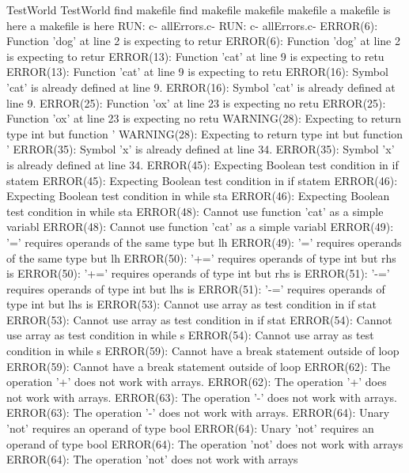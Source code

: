 \documentclass[12pt]{book}
\begin{document}
TestWorld                                                        TestWorld
find makefile                                                        find makefile
makefile                                                        makefile
a makefile is here                                                a makefile is here
RUN: c- allErrors.c-                                                RUN: c- allErrors.c-
ERROR(6): Function 'dog' at line 2 is expecting to retur        ERROR(6): Function 'dog' at line 2 is expecting to retur
ERROR(13): Function 'cat' at line 9 is expecting to retu        ERROR(13): Function 'cat' at line 9 is expecting to retu
ERROR(16): Symbol 'cat' is already defined at line 9.                ERROR(16): Symbol 'cat' is already defined at line 9.
ERROR(25): Function 'ox' at line 23 is expecting no retu        ERROR(25): Function 'ox' at line 23 is expecting no retu
WARNING(28): Expecting to return type int but function '        WARNING(28): Expecting to return type int but function '
ERROR(35): Symbol 'x' is already defined at line 34.                ERROR(35): Symbol 'x' is already defined at line 34.
ERROR(45): Expecting Boolean test condition in if statem        ERROR(45): Expecting Boolean test condition in if statem
ERROR(46): Expecting Boolean test condition in while sta        ERROR(46): Expecting Boolean test condition in while sta
ERROR(48): Cannot use function 'cat' as a simple variabl        ERROR(48): Cannot use function 'cat' as a simple variabl
ERROR(49): '=' requires operands of the same type but lh        ERROR(49): '=' requires operands of the same type but lh
ERROR(50): '+=' requires operands of type int but rhs is        ERROR(50): '+=' requires operands of type int but rhs is
ERROR(51): '-=' requires operands of type int but lhs is        ERROR(51): '-=' requires operands of type int but lhs is
ERROR(53): Cannot use array as test condition in if stat        ERROR(53): Cannot use array as test condition in if stat
ERROR(54): Cannot use array as test condition in while s        ERROR(54): Cannot use array as test condition in while s
ERROR(59): Cannot have a break statement outside of loop        ERROR(59): Cannot have a break statement outside of loop
ERROR(62): The operation '+' does not work with arrays.                ERROR(62): The operation '+' does not work with arrays.
ERROR(63): The operation '-' does not work with arrays.                ERROR(63): The operation '-' does not work with arrays.
ERROR(64): Unary 'not' requires an operand of type bool         ERROR(64): Unary 'not' requires an operand of type bool 
ERROR(64): The operation 'not' does not work with arrays        ERROR(64): The operation 'not' does not work with arrays
\end{document}
